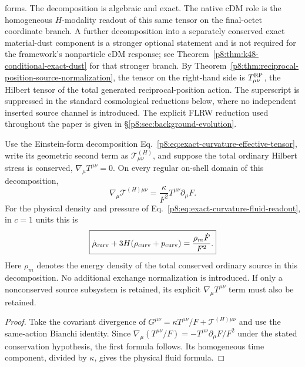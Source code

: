 \documentclass[12pt,a4paper]{article}
\begin{document}
forms.  The decomposition is algebraic and exact.  The native cDM role is the
homogeneous $H$-modality readout of this same tensor on the final-octet
coordinate branch.  A further decomposition into a separately conserved exact
material-dust component is a stronger optional statement and is not required
for the framework's nonparticle cDM response; see
Theorem~\ref{p8:thm:k48-conditional-exact-dust} for that stronger branch.
By Theorem~\ref{p8:thm:reciprocal-position-source-normalization}, the tensor on the right-hand side is \(T^{\rm RP}_{\mu\nu}\), the Hilbert tensor of the total generated reciprocal-position action.  The superscript is suppressed in the standard cosmological reductions below, where no independent inserted source channel is introduced.
The explicit FLRW reduction used throughout the paper is given in
\S\ref{p8:sec:background-evolution}.


\begin{corollary}
\label{p8:cor:v2139-h-response-exchange}
Use the Einstein-form decomposition
Eq.~\eqref{p8:eq:exact-curvature-effective-tensor}, write its geometric
second term as $\mathcal T^{(H)}_{\mu\nu}$, and suppose the total ordinary
Hilbert stress is conserved, $\nabla_\mu T^{\mu\nu}=0$.  On every regular
on-shell domain of this decomposition,
\begin{equation}
\label{p8:eq:v2139-h-response-exchange}
 \boxed{\nabla_\mu\mathcal T^{(H)\mu\nu}
   =\frac{\kappa}{F^2}T^{\mu\nu}\partial_\mu F.}
\end{equation}
For the physical density and pressure of
Eq.~\eqref{p8:eq:exact-curvature-fluid-readout}, in $c=1$ units this is
\[
 \boxed{\dot\rho_{\rm curv}
 +3H(\rho_{\rm curv}+p_{\rm curv})
 =\frac{\rho_m\dot F}{F^2}.}
\]
Here $\rho_m$ denotes the energy density of the total conserved ordinary
source in this decomposition.  No additional exchange normalization is
introduced.  If only a nonconserved source subsystem is retained, its explicit
$\nabla_\mu T^{\mu\nu}$ term must also be retained.
\end{corollary}
\begin{proof}
Take the covariant divergence of
$G^{\mu\nu}=\kappa T^{\mu\nu}/F+\mathcal T^{(H)\mu\nu}$ and use the
same-action Bianchi identity.  Since
$\nabla_\mu(T^{\mu\nu}/F)=-T^{\mu\nu}\partial_\mu F/F^2$ under the
stated conservation hypothesis, the first formula follows.  Its homogeneous
time component, divided by $\kappa$, gives the physical fluid formula.
\end{proof}
\end{document}
